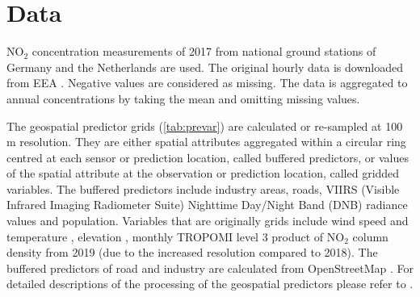 \documentclass{article}
\begin{document}
 
 
\section{Data}
NO$_2$ concentration measurements of 2017 from national ground stations of Germany and the Netherlands are used. The original hourly data is downloaded from EEA \citep{EEA}. Negative values are considered as missing. The data is aggregated to annual concentrations by taking the mean and omitting missing values.

The geospatial predictor grids (\cref{tab:prevar}) are calculated or re-sampled at 100 m resolution. They are either spatial attributes aggregated within a circular ring centred at each sensor or prediction location, called buffered predictors, or values of the spatial attribute at the observation or prediction location, called gridded variables. The buffered predictors include industry areas, roads, VIIRS (Visible Infrared Imaging Radiometer Suite) Nighttime Day/Night Band (DNB) radiance values \citep[nightlight,][]{nightlight} and population. Variables that are originally grids include wind speed and temperature \citep{dee2011era}, elevation \citep{amante2009etopo1}, monthly TROPOMI level 3 product of NO$_2$ column density  \citep{TROPOMIgee} from 2019 (due to the increased resolution compared to 2018). The buffered predictors of road and industry are calculated from OpenStreetMap  \citep{openstreetmap}. For detailed descriptions of the processing of the geospatial predictors please refer to \cite{luglobal}.   
\end{document}
